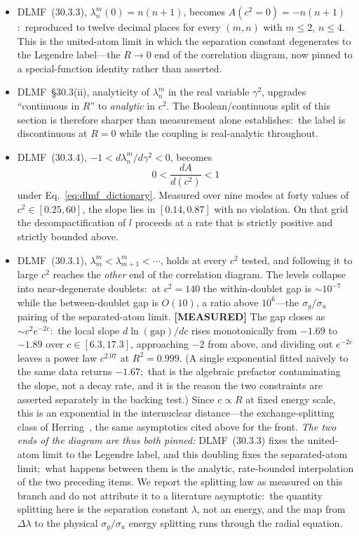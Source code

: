 \documentclass[aps,pra,twocolumn,superscriptaddress,longbibliography]{revtex4-2}
\begin{document}
\begin{itemize}
\item DLMF~(30.3.3), $\lambda^m_n(0) = n(n+1)$, becomes
  $A(c^2 = 0) = -n(n+1)$:\ reproduced to twelve decimal places for every
  $(m, n)$ with $m \le 2$, $n \le 4$.  This is the united-atom limit in
  which the separation constant degenerates to the Legendre label---the
  $R \to 0$ end of the correlation diagram, now pinned to a
  special-function identity rather than asserted.
\item DLMF~\S30.3(ii), analyticity of $\lambda^m_n$ in the real variable
  $\gamma^2$, upgrades ``continuous in $R$'' to \emph{analytic} in $c^2$.
  The Boolean/continuous split of this section is therefore sharper than
  measurement alone establishes:\ the label is discontinuous at $R = 0$
  while the coupling is real-analytic throughout.
\item DLMF~(30.3.4), $-1 < d\lambda^m_n/d\gamma^2 < 0$, becomes
  \begin{equation}
    0 < \frac{dA}{d(c^2)} < 1
    \label{eq:dlmf_rate_bound}
  \end{equation}
  under Eq.~\eqref{eq:dlmf_dictionary}.  Measured over nine modes at forty
  values of $c^2 \in [0.25, 60]$, the slope lies in $[0.14, 0.87]$ with no
  violation.  On that grid the decompactification of $l$ proceeds at a rate
  that is strictly positive and strictly bounded above.
\item DLMF~(30.3.1), $\lambda^m_m < \lambda^m_{m+1} < \cdots$, holds at
  every $c^2$ tested, and following it to large $c^2$ reaches the
  \emph{other} end of the correlation diagram.  The levels collapse into
  near-degenerate doublets:\ at $c^2 = 140$ the within-doublet gap is
  $\sim\!10^{-7}$ while the between-doublet gap is $O(10)$, a ratio above
  $10^{6}$---the $\sigma_g/\sigma_u$ pairing of the separated-atom limit.
  \textbf{[MEASURED]} The gap closes as $\sim c^{2}e^{-2c}$:\ the local
  slope $d\ln(\text{gap})/dc$ rises monotonically from $-1.69$ to $-1.89$
  over $c \in [6.3, 17.3]$, approaching $-2$ from above, and dividing out
  $e^{-2c}$ leaves a power law $c^{2.07}$ at $R^2 = 0.999$.  (A single
  exponential fitted naively to the same data returns $-1.67$;\ that is the
  algebraic prefactor contaminating the slope, not a decay rate, and it is
  the reason the two constraints are asserted separately in the backing
  test.)  Since $c \propto R$ at fixed energy scale, this is an exponential
  in the internuclear distance---the exchange-splitting class of
  Herring~\cite{herring1962,herring_flicker1964}, the same asymptotics
  cited above for the front.  \emph{The two ends of the diagram are thus
  both pinned:} DLMF~(30.3.3) fixes the united-atom limit to the Legendre
  label, and this doubling fixes the separated-atom limit;\ what happens
  between them is the analytic, rate-bounded interpolation of the two
  preceding items.  We report the splitting law as measured on this branch
  and do not attribute it to a literature asymptotic:\ the quantity
  splitting here is the separation constant $\lambda$, not an energy, and
  the map from $\Delta\lambda$ to the physical $\sigma_g/\sigma_u$ energy
  splitting runs through the radial equation.
\end{itemize}
\end{document}
